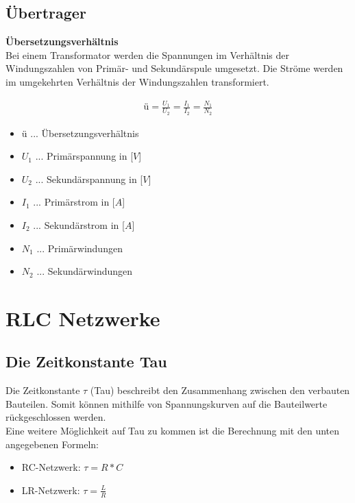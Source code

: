 \subsection{Übertrager}

\textbf{Übersetzungsverhältnis} \\

Bei einem Transformator werden die Spannungen im Verhältnis der Windungszahlen von Primär- und Sekundärspule umgesetzt. Die Ströme werden im umgekehrten Verhältnis der Windungszahlen transformiert.

\begin{align}
    ü=\frac{U_1}{U_2}=\frac{I_1}{I_2}=\frac{N_1}{N_2}
\end{align}
\begin{itemize}
    \item $ü$ ... Übersetzungsverhältnis
    \item $U_1$ ... Primärspannung in [$V$]
    \item $U_2$ ... Sekundärspannung in [$V$]
    \item $I_1$ ... Primärstrom in [$A$]
    \item $I_2$ ... Sekundärstrom in [$A$]
    \item $N_1$ ... Primärwindungen
    \item $N_2$ ... Sekundärwindungen
\end{itemize}

\newpage

\section{RLC Netzwerke}
\subsection{Die Zeitkonstante Tau}
Die Zeitkonstante $\tau$ (Tau) beschreibt den Zusammenhang zwischen den verbauten Bauteilen. Somit können mithilfe von Spannungskurven auf die Bauteilwerte rückgeschlossen werden. \\
Eine weitere Möglichkeit auf Tau zu kommen ist die Berechnung mit den unten angegebenen Formeln:
\begin{itemize}
    \item RC-Netzwerk: {\large $\tau = R*C$}
    \item LR-Netzwerk: {\large $\tau = \frac{L}{R}$}
\end{itemize}
